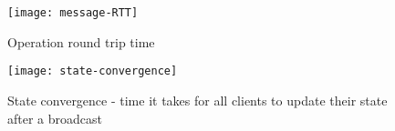 \begin{figure}
    \centering
    \texttt{[image: message-RTT]}
    \caption{Operation round trip time}
    \label{fig:message-RTT}
\end{figure}


\begin{figure}
    \centering
    \texttt{[image: state-convergence]}
    \caption{State convergence - time it takes for all clients to update their state after a broadcast}
    \label{fig:state-convergence}
\end{figure}